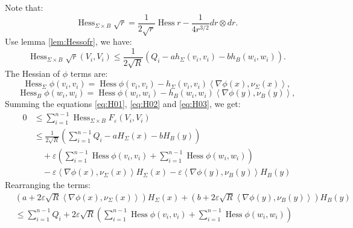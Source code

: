 \documentclass[reqno, 11pt]{amsart}
\theoremstyle{plain}
\theoremstyle{definition}
\theoremstyle{remark}
\numberwithin{equation}{section}
\begin{document}
Note that:
	\begin{equation*}
		\operatorname{Hess}_{\Sigma\times B} \sqrt{ r } = \frac{1}{2\sqrt r}\operatorname{Hess}r - \frac{1}{4r^{3/2}}dr\otimes dr.
	\end{equation*}
	Use lemma \ref{lem:Hessofr}, we have:
	\begin{equation}\label{eq:H01}
		\operatorname{Hess}_{\Sigma\times B} \sqrt{ r }(V_{i}, V_{i}) \le \frac{1}{2\sqrt{R}} (Q_{i} -a h_{\Sigma}(v_{i}, v_{i}) -b h_{B}(w_{i}, w_{i})).
	\end{equation}
	The Hessian of $\phi$ terms are:
	\begin{equation}\label{eq:H02}
		\operatorname{Hess}_{\Sigma}\phi(v_{i}, v_{i}) = \operatorname{Hess} \phi(v_{i}, v_{i}) - h_{\Sigma}(v_{i}, v_{i})
		\left\langle \nabla \phi (x), \nu_{\Sigma}(x) \right\rangle, 
	\end{equation}
	\begin{equation}\label{eq:H03}
		\operatorname{Hess}_{B}\phi(w_{i}, w_{i}) = \operatorname{Hess} \phi(w_{i}, w_{i}) - h_{B}(w_{i}, w_{i})
		\left\langle \nabla \phi (y), \nu_{B}(y) \right\rangle, 
	\end{equation}
Summing the equations \eqref{eq:H01}, \eqref{eq:H02} and \eqref{eq:H03}, we get:
	\begin{equation*}
		\begin{aligned}
			0 &\le \sum_{i=1}^{n-1}\operatorname{Hess}_{\Sigma\times B}F_{\varepsilon}(V_{i}, V_{i})  \\
			  &\le \frac{1}{2\sqrt{R}}\left( \sum_{i=1}^{n-1}Q_{i} -a H_{\Sigma}(x) -b H_{B}(y) \right)\\
			  &\quad + \varepsilon \left( \sum_{i=1}^{n-1} \operatorname{Hess} \phi(v_{i}, v_{i}) 
			  + \sum_{i=1}^{n-1} \operatorname{Hess} \phi(w_{i}, w_{i})\right)\\
			  &\quad -\varepsilon \left\langle \nabla \phi(x), \nu_{\Sigma}(x) \right\rangle H_{\Sigma}(x)
			    -\varepsilon \left\langle \nabla \phi(y), \nu_{B}(y) \right\rangle H_{B}(y)
		\end{aligned}
	\end{equation*}
Rearranging the terms:
\begin{equation}\label{eq:Main}
	\begin{aligned}
		&\left(a+2 \varepsilon \sqrt{R}  \left\langle \nabla \phi(x), \nu_{\Sigma}(x) \right\rangle \right ) H_{\Sigma}(x)
		+\left(b+2 \varepsilon \sqrt{R}  \left\langle \nabla \phi(y), \nu_{B}(y) \right\rangle \right ) H_{B}(y)\\
		&\le \sum_{i=1}^{n-1} Q_{i} +2 \varepsilon \sqrt{R}  \left( \sum_{i=1}^{n-1} \operatorname{Hess} \phi(v_{i}, v_{i}) 
			  + \sum_{i=1}^{n-1} \operatorname{Hess} \phi(w_{i}, w_{i})\right)& 
	\end{aligned}
\end{equation}
\end{document}
